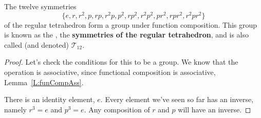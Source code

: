 \documentclass{ximera}
\begin{document}
\begin{example}
  The twelve symmetries
  \[
  \{e,r,r^2,p,rp,r^2p,p^2,rp^2,r^2p^2,pr^2,rpr^2,r^2pr^2\}
  \]
  of the regular tetrahedron form a group under function
  composition. This group is known as the , the
  \textbf{symmetries of the regular tetrahedron}, and is also called (and
  denoted) $\mathcal{T}_{12}$.
  \begin{proof}
    Let's check the conditions for this to be a group. We know that
    the operation is associative, since functional composition is
    associative, Lemma~\ref{L:funCompAss}.

    There is an identity element, $e$. Every element we've seen so far
    has an inverse, namely $r^3 = e$ and $p^3= e$. Any composition of
    $r$ and $p$ will have an inverse.
    

\end{proof}
\end{example}
\end{document}

